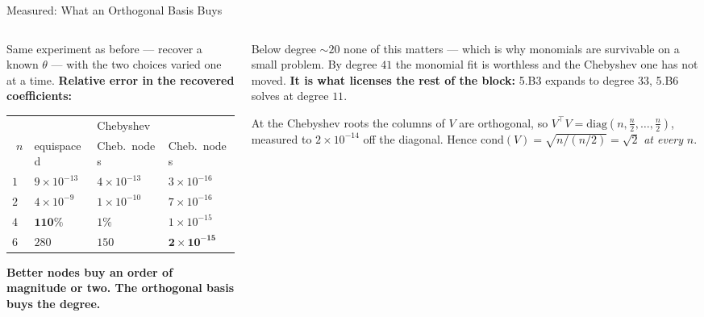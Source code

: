 \begin{frame}{Measured: What an Orthogonal Basis Buys}
\begin{columns}[T]
\begin{column}{0.53\textwidth}
\small
Same experiment as before --- recover a known $\theta$ --- with the two choices varied one at a time.
\textbf{Relative error in the recovered coefficients:}
\medskip
\begin{center}\footnotesize
\begin{tabularx}{\linewidth}{@{}r >{\raggedleft\arraybackslash}X >{\raggedleft\arraybackslash}X >{\raggedleft\arraybackslash}p{1.5cm}@{}}
\toprule
 & \multicolumn{2}{c}{monomial basis} & Chebyshev \\
$n$ & equispaced & Cheb.\ nodes & Cheb.\ nodes \\
\midrule
$13$ & $9\times10^{-13}$ & $4\times10^{-13}$ & $3\times10^{-16}$ \\
$21$ & $4\times10^{-9}$ & $1\times10^{-10}$ & $7\times10^{-16}$ \\
$41$ & $\mathbf{110\%}$ & $1\%$ & $1\times10^{-15}$ \\
$61$ & $280$ & $150$ & $\mathbf{2\times10^{-15}}$ \\
\bottomrule
\end{tabularx}
\end{center}
\medskip
\textbf{Better nodes buy an order of magnitude or two. The orthogonal basis buys the degree.}
\end{column}
\begin{column}{0.44\textwidth}
\begin{takeawaybox}\footnotesize
Below degree $\sim20$ none of this matters --- which is why monomials are survivable on a small
problem. By degree $41$ the monomial fit is worthless and the Chebyshev one has not moved. \textbf{It
is what licenses the rest of the block:} 5.B3 expands to degree $33$, 5.B6 solves at degree $11$.
\end{takeawaybox}
\medskip
\begin{conceptbox}[title=\textbf{Why it never degrades}]\footnotesize
At the Chebyshev roots the columns of $V$ are orthogonal, so
$V^{\!\top}V=\mathrm{diag}(n,\tfrac n2,\dots,\tfrac n2)$, measured to $2\times10^{-14}$ off the
diagonal. Hence $\mathrm{cond}(V)=\sqrt{n/(n/2)}=\sqrt2$ \emph{at every} $n$.
\end{conceptbox}
\end{column}
\end{columns}
\vspace{1mm}
\end{frame}

